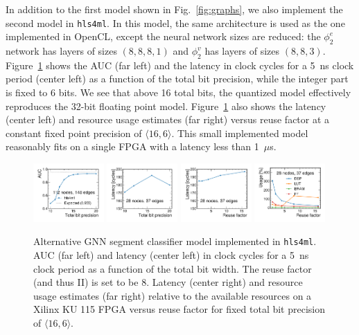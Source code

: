 \documentclass{article}
\newcommand{\hlsfml}{\texttt{hls4ml}\xspace}
\begin{document}
In addition to the first model shown in Fig.~\ref{fig:graphs}, we also implement the second model in \hlsfml.
In this model, the same architecture is used as the one implemented in OpenCL, except the neural network sizes are reduced: the $\phi_2^e$ network has layers of sizes $(8, 8, 8, 1)$ and $\phi_2^v$ has layers of sizes $(8, 8, 3)$.
Figure~\ref{fig:hlsfml_scan_v2} shows the AUC (far left) and the latency in clock cycles for a 5~ns clock period (center left) as a function of the total bit precision, while the integer part is fixed to 6 bits.
We see that above 16 total bits, the quantized model effectively reproduces the 32-bit floating point model.
Figure~\ref{fig:hlsfml_scan_v2} also shows the latency (center left) and resource usage estimates (far right) versus reuse factor at a constant fixed point precision of $\langle16,6\rangle$.
This small implemented model reasonably fits on a single FPGA with a latency less than 1~$\mu$s.

\begin{figure}[htpb]
    \centering
    \includegraphics[width=0.24\textwidth]{figures/AUC_vs_BP_v2.pdf}
    \includegraphics[width=0.24\textwidth]{figures/Latency_vs_BP_v2.pdf}    %
    \includegraphics[width=0.24\textwidth]{figures/Latency_vs_RF_v2.pdf}
    \includegraphics[width=0.24\textwidth]{figures/Resources_vs_RF_v2.pdf}
    \caption{Alternative GNN segment classifier model implemented in \hlsfml.
    AUC (far left) and latency (center left) in clock cycles for a 5~ns clock period as a function of the total bit width.
    The reuse factor (and thus II) is set to be 8.
    Latency (center right) and resource usage estimates (far right) relative to the available resources on a Xilinx KU 115 FPGA versus reuse factor for fixed total bit precision of $\langle 16, 6\rangle$.}
    \label{fig:hlsfml_scan_v2}
\end{figure}




\end{document}
